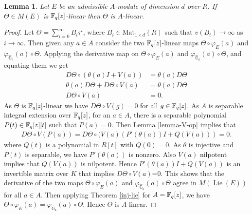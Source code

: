 \documentclass{amsart}
\newtheorem {lemma}[theorem] {\bf Lemma}
\numberwithin {equation}{section}
\def \hG{\hat{\mathbb{G}}_{\mathrm{a}}}
\DeclareMathOperator{\Lie}{\mathrm{Lie}}
\begin{document}
\begin{lemma}\label{ext-A-lin} Let $E$ be an admissible $A$-module of dimension $d$ over $R$. If $\Theta\in M(E)$ is $\mathbb{F}_{q}[z]$-linear then $\Theta$ is $A$-linear.
\end{lemma}
\begin{proof}
Let $\Theta=\displaystyle{\sum_{i=0}^{\infty}}B_{i}{\tau}^{i}$, where $B_{i}\in \mathrm{Mat}_{1\times d}(R)$ such that $v(B_{i})\rightarrow \infty$ as $i\rightarrow \infty$. Then given any $a\in A$ consider the two $\mathbb{F}_{q}[z]$-linear maps $\Theta\circ \varphi_{E}(a)$ and $\varphi_{\hG}(a)\circ \Theta$. Applying the derivative map on $\Theta\circ \varphi_{E}(a)$ and $\varphi_{\hG}(a)\circ \Theta$, and equating them we get
\begin{align*}
D\Theta\circ (\theta(a)I+V(a))&=\theta(a)D\Theta\\
\theta(a)D\Theta +D\Theta\circ V(a)&=\theta(a)D\Theta\\
D\Theta\circ V(a)&=0.
\end{align*} 
As $\Theta$ is $\mathbb{F}_{q}[z]$-linear we have $D\Theta \circ V(g)=0$ for all $g\in \mathbb{F}_{q}[z]$. As $A$ is separable integral extension over $\mathbb{F}_{q}[z]$, for an $a\in A$, there is a separable polynomial $P(t)\in \mathbb{F}_{q}[z][t]$ such that $P(a)=0$.  
Then Lemma \ref{lemma-V-op} implies that
\begin{align*}
D\Theta\circ V(P(a))=D\Theta \circ (V(a)(P'(\theta (a))I+ Q(V(a)))=0.
\end{align*}
where $Q(t)$ is a polynomial in $R[t]$ with $Q(0)=0$. As $\theta$ is injective and $P(t)$ is separable, we have $P'(\theta(a))$ is nonzero. Also $V(a)$ nilpotent implies that $Q(V(a))$ is nilpotent. Hence $P'(\theta (a))I+ Q(V(a))$ is an invertible matrix over $K$ that implies $D\Theta \circ V(a)$=0. This shows that the derivative of the two maps $\Theta\circ \varphi_{E}(a)$ and $\varphi_{\hG}(a)\circ \Theta$ agree in $M(\Lie(E))$ for all $a\in A$. Then applying Theorem \ref{inj-lie} for $A=\mathbb{F}_{q}[z]$, we have $\Theta\circ \varphi_{E}(a)=\varphi_{\hG}(a)\circ \Theta.$ Hence $\Theta$ is $A$-linear. 
\end{proof}
\end{document}
